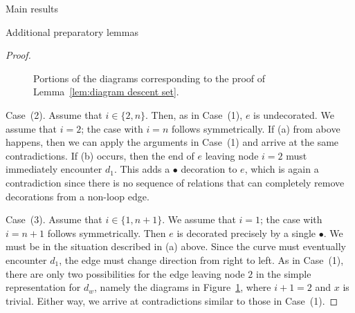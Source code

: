 \documentclass[11pt]{amsart}
\theoremstyle{definition}
\numberwithin{equation}{section}
\newcommand{\bcirc}{\bullet}
\renewcommand{\(}{\left(}
\renewcommand{\)}{\right)}
\begin{document}
\begin{section}{Main results}
\begin{subsection}{Additional preparatory lemmas}
\begin{proof}
\begin{figure}[!ht]
{
}
\caption{Portions of the diagrams corresponding to the proof of Lemma~\ref{lem:diagram descent set}.}\label{fig:diagram descent set}
\end{figure}

Case~(2).  Assume that $i \in \{2, n\}$.  Then, as in Case~(1), $e$ is undecorated.  We assume that $i=2$; the case with $i=n$ follows symmetrically.  If (a) from above happens, then we can apply the arguments in Case~(1) and arrive at the same contradictions.  If (b) occurs, then the end of $e$ leaving node $i=2$ must immediately encounter $d_{1}$.  This adds a $\bcirc$ decoration to $e$, which is again a contradiction since there is no sequence of relations that can completely remove decorations from a non-loop edge.

Case~(3).  Assume that $i \in \{1, n+1\}$.  We assume that $i=1$; the case with $i=n+1$ follows symmetrically.  Then $e$ is decorated precisely by a single $\bcirc$.  We must be in the situation described in (a) above.  Since the curve must eventually encounter $d_{1}$, the edge must change direction from right to left.   As in Case~(1), there are only two possibilities for the edge leaving node $2$ in the simple representation for $d_{w}$, namely the diagrams in Figure~\ref{fig:diagram descent set}, where $i+1=2$ and $x$ is trivial.  Either way, we arrive at contradictions similar to those in Case~(1).


\end{proof}
\end{subsection}
\end{section}
\end{document}
